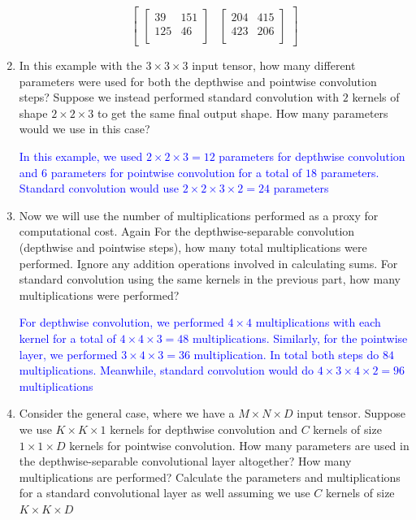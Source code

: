 \documentclass{article}
\begin{document}
\begin{enumerate}[label=(\alph*)]
{\[\begin{bmatrix}
            \begin{bmatrix}
                39 & 151  \\
                125 & 46 \\
            \end{bmatrix}
            &
            \begin{bmatrix}
                204 & 415  \\
                423 & 206 \\
            \end{bmatrix}
        \end{bmatrix}
    \]
    }
    \item In this example with the $3 \times 3 \times 3$ input tensor, how many different parameters were used for both the depthwise and pointwise convolution steps? Suppose we instead performed standard convolution with $2$ kernels of shape $2 \times 2 \times 3$ to get the same final output shape. How many parameters would we use in this case?
    
    \textcolor{blue}{In this example, we used $2 \times 2 \times 3 = 12$ parameters for depthwise convolution and $6$ parameters for pointwise convolution for a total of $18$ parameters. Standard convolution would use $2 \times 2 \times 3 \times 2 = 24$ parameters}

    \item Now we will use the number of multiplications performed as a proxy for computational cost. Again For the depthwise-separable convolution (depthwise and pointwise steps), how many total multiplications were performed. Ignore any addition operations involved in calculating sums. For standard convolution using the same kernels in the previous part, how many multiplications were performed?

    \textcolor{blue}{For depthwise convolution, we performed $4\times4$ multiplications with each kernel for a total of $4\times4\times3 = 48$ multiplications. Similarly, for the pointwise layer, we performed $3\times4\times3 = 36$ multiplication. In total both steps do $84$ multiplications. Meanwhile, standard convolution would do $4\times3\times4\times2 = 96$ multiplications}
    
    \item Consider the general case, where we have a $M \times N \times D$ input tensor. Suppose we use $K \times K \times 1$ kernels for depthwise convolution and $C$ kernels of size $1 \times 1\times D$ kernels for pointwise convolution. How many parameters are used in the depthwise-separable convolutional layer altogether? How many multiplications are performed? Calculate the parameters and multiplications for a standard convolutional layer as well assuming we use $C$ kernels of size $K \times K \times D$


\end{enumerate}
\end{document}

